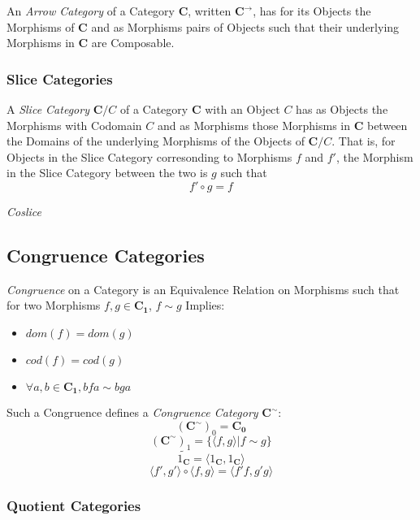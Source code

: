An \emph{Arrow Category} of a Category $\mathbf{C}$, written
$\mathbf{C^{\rightarrow}}$, has for its Objects the Morphisms of
$\mathbf{C}$ and as Morphisms pairs of Objects such that their
underlying Morphisms in $\mathbf{C}$ are Composable.

\subsubsection{Slice Categories}\label{subsec:slice_categories}

A \emph{Slice Category} $\mathbf{C}/C$ of a Category $\mathbf{C}$ with
an Object $C$ has as Objects the Morphisms with Codomain $C$ and as
Morphisms those Morphisms in $\mathbf{C}$ between the Domains of the
underlying Morphisms of the Objects of $\mathbf{C}/C$. That is, for
Objects in the Slice Category corresonding to Morphisms $f$ and $f'$,
the Morphism in the Slice Category between the two is $g$ such that
\[
    f' \circ g = f
\]

\emph{Coslice}

\subsection{Congruence Categories}\label{subsec:category_congruence}

\emph{Congruence} on a Category is an Equivalence Relation on
Morphisms such that for two Morphisms $f,g \in \mathbf{C_1}$, $f \sim
g$ Implies:
\begin{itemize}
\item $dom(f) = dom(g)$
\item $cod(f) = cod(g)$
\item $\forall a,b \in \mathbf{C_1}, bfa \sim bga$
\end{itemize}
Such a Congruence defines a \emph{Congruence Category}
$\mathbf{C^{\sim}}$:
\[
    (\mathbf{C^{\sim}})_0 = \mathbf{C_0}
\]\[
    (\mathbf{C^{\sim}})_1 = \{\langle f,g \rangle | f \sim g\}
\]\[
    \tilde{1_\mathbf{C}} = \langle 1_\mathbf{C}, 1_\mathbf{C} \rangle
\]\[
    \langle f',g' \rangle \circ \langle f,g \rangle = \langle f'f,g'g \rangle
\]

\subsubsection{Quotient Categories}\label{subsec:category_quotient}

